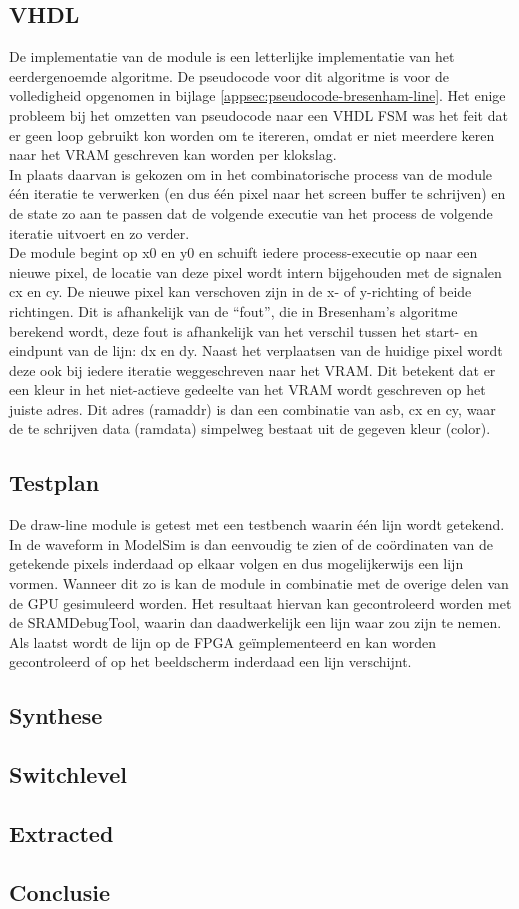 \documentclass{scrartcl} %
\begin{document}
\subsection{VHDL}
De implementatie van de module is een letterlijke implementatie van het eerdergenoemde algoritme. De pseudocode voor dit algoritme is voor de volledigheid opgenomen in bijlage \ref{appsec:pseudocode-bresenham-line}. Het enige probleem bij het omzetten van pseudocode naar een VHDL FSM was het feit dat er geen loop gebruikt kon worden om te itereren, omdat er niet meerdere keren naar het VRAM geschreven kan worden per klokslag.
\\
In plaats daarvan is gekozen om in het combinatorische process van de module één iteratie te verwerken (en dus één pixel naar het screen buffer te schrijven) en de state zo aan te passen dat de volgende executie van het process de volgende iteratie uitvoert en zo verder.
\\
De module begint op x0 en y0 en schuift iedere process-executie op naar een nieuwe pixel, de locatie van deze pixel wordt intern bijgehouden met de signalen cx en cy. De nieuwe pixel kan verschoven zijn in de x- of y-richting of beide richtingen. Dit is afhankelijk van de ``fout'', die in Bresenham's algoritme berekend wordt, deze fout is afhankelijk van het verschil tussen het start- en eindpunt van de lijn: dx en dy. Naast het verplaatsen van de huidige pixel wordt deze ook bij iedere iteratie weggeschreven naar het VRAM. Dit betekent dat er een kleur in het niet-actieve gedeelte van het VRAM wordt geschreven op het juiste adres. Dit adres (ramaddr) is dan een combinatie van asb, cx en cy, waar de te schrijven data (ramdata) simpelweg bestaat uit de gegeven kleur (color).

\subsection{Testplan}
De draw-line module is getest met een testbench waarin één lijn wordt getekend. In de waveform in ModelSim is dan eenvoudig te zien of de coördinaten van de getekende pixels inderdaad op elkaar volgen en dus mogelijkerwijs een lijn vormen. Wanneer dit zo is kan de module in combinatie met de overige delen van de GPU gesimuleerd worden. Het resultaat hiervan kan gecontroleerd worden met de SRAMDebugTool, waarin dan daadwerkelijk een lijn waar zou zijn te nemen. Als laatst wordt de lijn op de FPGA geïmplementeerd en kan worden gecontroleerd of op het beeldscherm inderdaad een lijn verschijnt.

\subsection{Synthese}


\subsection{Switchlevel}


\subsection{Extracted}

\subsection{Conclusie}
\end{document}
